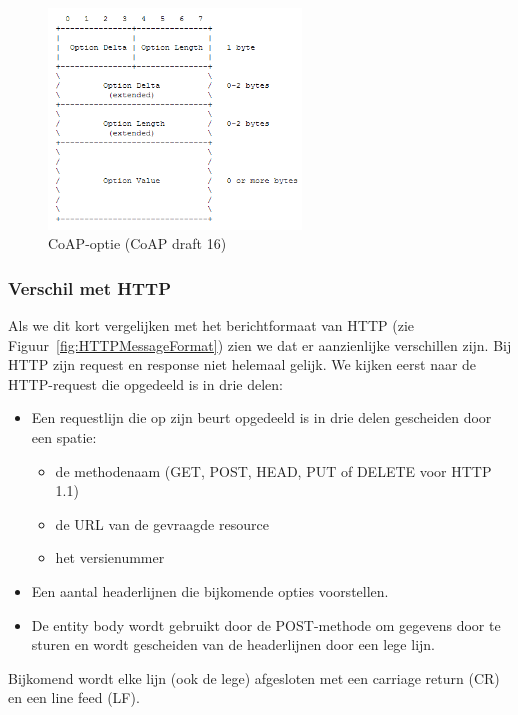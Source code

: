 \begin{figure}[h]
\centering
\includegraphics[width=0.6\textwidth]{fig/CoAPOpties}
\vspace{-10pt}
\caption{CoAP-optie (CoAP draft 16)}
\label{fig:CoAPOpties}
\end{figure}

\newpage

\subsubsection{Verschil met HTTP}

Als we dit kort vergelijken met het berichtformaat van HTTP (zie Figuur~\ref{fig:HTTPMessageFormat}) zien we dat er aanzienlijke verschillen zijn. Bij HTTP zijn request en response niet helemaal gelijk. We kijken eerst naar de HTTP-request die opgedeeld is in drie delen:
\begin{itemize}
\item Een requestlijn die op zijn beurt opgedeeld is in drie delen gescheiden door een spatie:
\begin{itemize}
\item de methodenaam (GET, POST, HEAD, PUT of DELETE voor HTTP 1.1)
\item de URL van de gevraagde resource
\item het versienummer
\end{itemize}
\item Een aantal headerlijnen die bijkomende opties voorstellen.
\item De entity body wordt gebruikt door de POST-methode om gegevens door te sturen en wordt gescheiden van de headerlijnen door een lege lijn. 
\end{itemize}
Bijkomend wordt elke lijn (ook de lege) afgesloten met een carriage return (CR) en een line feed (LF).

